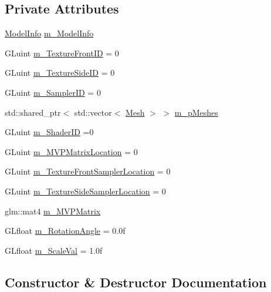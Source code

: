\subsection*{Private Attributes}
\begin{DoxyCompactItemize}
\item 
\hyperlink{struct_face3_d_1_1_model_1_1_model_info}{Model\+Info} \hyperlink{class_face3_d_1_1_model_a4e781e1061417cad95eb99640fc4f77b}{m\+\_\+\+Model\+Info}
\item 
G\+Luint \hyperlink{class_face3_d_1_1_model_adf4a54487670014da5422dc36940a332}{m\+\_\+\+Texture\+Front\+ID} = 0
\item 
G\+Luint \hyperlink{class_face3_d_1_1_model_a6bd8337f56d992cc16d26ae1b6af4c21}{m\+\_\+\+Texture\+Side\+ID} = 0
\item 
G\+Luint \hyperlink{class_face3_d_1_1_model_a7e658ebb2162121ee78586ae1435f37a}{m\+\_\+\+Sampler\+ID} = 0
\item 
std\+::shared\+\_\+ptr$<$ std\+::vector$<$ \hyperlink{class_face3_d_1_1_mesh}{Mesh} $>$ $>$ \hyperlink{class_face3_d_1_1_model_a8e66abbba8d896017fe33c247036f133}{m\+\_\+p\+Meshes}
\item 
G\+Luint \hyperlink{class_face3_d_1_1_model_afbe10fef4fd5836080b32f75519bafe1}{m\+\_\+\+Shader\+ID} =0
\item 
G\+Luint \hyperlink{class_face3_d_1_1_model_af342a14a7054f45b1077e7eea5dc892b}{m\+\_\+\+M\+V\+P\+Matrix\+Location} = 0
\item 
G\+Luint \hyperlink{class_face3_d_1_1_model_a327fa317ef7aeb53d98a11c98325ca8c}{m\+\_\+\+Texture\+Front\+Sampler\+Location} = 0
\item 
G\+Luint \hyperlink{class_face3_d_1_1_model_a206d2e11c046acd3bbbb8a6ce8aa4586}{m\+\_\+\+Texture\+Side\+Sampler\+Location} = 0
\item 
glm\+::mat4 \hyperlink{class_face3_d_1_1_model_abf3da04870854ee1b1fa4c02d214f3cc}{m\+\_\+\+M\+V\+P\+Matrix}
\item 
G\+Lfloat \hyperlink{class_face3_d_1_1_model_a5097ce51273431b3684239a51af9fa72}{m\+\_\+\+Rotation\+Angle} = 0.\+0f
\item 
G\+Lfloat \hyperlink{class_face3_d_1_1_model_a08dad50dd45a852f2426f43236b7c81c}{m\+\_\+\+Scale\+Val} = 1.\+0f
\end{DoxyCompactItemize}


\subsection{Constructor \& Destructor Documentation}
